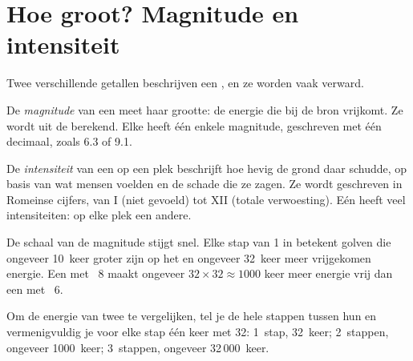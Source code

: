 \section{Hoe groot? Magnitude en intensiteit}

Twee verschillende getallen beschrijven een , en ze worden vaak verward.

\begin{definition}[Magnitude]\label{def:g7:earthquakes:magnitude}
De \emph{magnitude} van een  meet haar grootte:
de energie die bij de bron vrijkomt. Ze wordt uit de 
berekend. Elke  heeft één enkele magnitude, geschreven met één
decimaal, zoals 6.3 of 9.1.
\end{definition}

\begin{definition}[Intensiteit]\label{def:g7:earthquakes:intensity}
De \emph{intensiteit} van een  op een plek
beschrijft hoe hevig de grond daar schudde, op basis van wat mensen voelden
en de schade die ze zagen. Ze wordt geschreven in Romeinse cijfers, van I
(niet gevoeld) tot XII (totale verwoesting). Eén  heeft veel
intensiteiten: op elke plek een andere.
\end{definition}

De schaal van de magnitude stijgt snel. Elke stap van 1 in 
betekent golven die ongeveer 10~keer groter zijn op het  en
ongeveer 32~keer meer vrijgekomen energie. Een  met ~8
maakt ongeveer $32 \times 32 \approx 1000$ keer meer energie vrij dan een
met ~6.

\begin{method}\label{met:g7:earthquakes:magnitudes}
Om de energie van twee  te vergelijken, tel je de hele stappen
tussen hun  en vermenigvuldig je voor elke stap één keer met 32:
1~stap, 32~keer; 2~stappen, ongeveer 1000~keer; 3~stappen, ongeveer
32\,000~keer.
\end{method}


